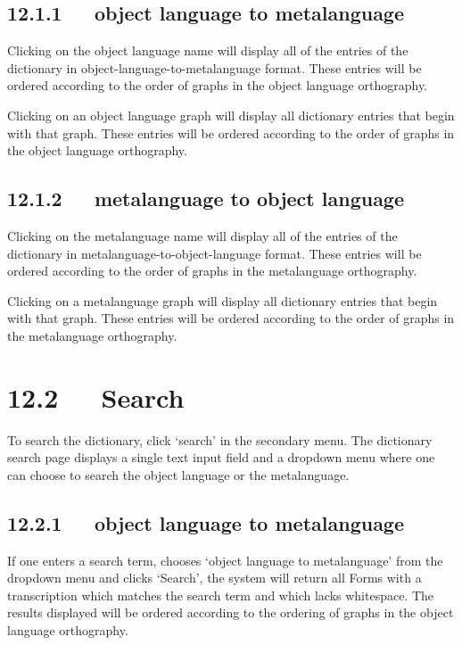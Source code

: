 \documentclass[letterpaper,10pt,english]{sphinxmanual}
\begin{document}
\subsection{12.1.1   object language to metalanguage}
\label{documentation:object-language-to-metalanguage}
Clicking on the object language name will display all of the entries of the
dictionary in object-language-to-metalanguage format.  These entries will be
ordered according to the order of graphs in the object language orthography.

Clicking on an object language graph will display all dictionary entries that
begin with that graph.  These entries will be ordered according to the order of
graphs in the object language orthography.


\subsection{12.1.2   metalanguage to object language}
\label{documentation:metalanguage-to-object-language}
Clicking on the metalanguage name will display all of the entries of the
dictionary in metalanguage-to-object-language format.  These entries will be
ordered according to the order of graphs in the metalanguage orthography.

Clicking on a metalanguage graph will display all dictionary entries that
begin with that graph.  These entries will be ordered according to the order of
graphs in the metalanguage orthography.


\section{12.2   Search}
\label{documentation:search}
To search the dictionary, click `search' in the secondary menu.  The dictionary
search page displays a single text input field and a dropdown menu where one can
choose to search the object language or the metalanguage.


\subsection{12.2.1   object language to metalanguage}
\label{documentation:id23}
If one enters a search term, chooses `object language to metalanguage' from the
dropdown menu and clicks `Search', the system will return all Forms with a
transcription which matches the search term and which lacks whitespace.  The
results displayed will be ordered according to the ordering of graphs in the
object language orthography.
\end{document}
